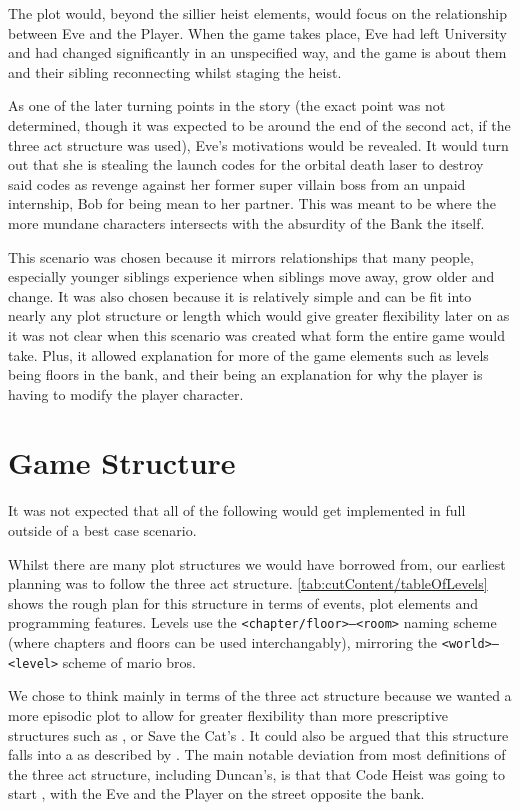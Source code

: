 The plot would, beyond the sillier heist elements, would focus on the relationship between Eve and the Player. When the game takes place, Eve had left University and had changed significantly in an unspecified way, and the game is about them and their sibling reconnecting whilst staging the heist.

As one of the later turning points in the story (the exact point was not determined, though it was expected to be around the end of the second act, if the three act structure was used), Eve's motivations would be revealed. It would turn out that she is stealing the launch codes for the orbital death laser to destroy said codes as revenge against her former super villain boss from an unpaid internship, Bob for being mean to her partner. This was meant to be where the more mundane characters intersects with the absurdity of the Bank the itself.

This scenario was chosen because it mirrors relationships that many people, especially younger siblings experience when siblings move away, grow older and change. It was also chosen because it is relatively simple and can be fit into nearly any plot structure or length which would give greater flexibility later on as it was not clear when this scenario was created what form the entire game would take. Plus, it allowed explanation for more of the game elements such as levels being floors in the bank, and their being an explanation for why the player is having to modify the player character.

\section{Game Structure}\label{sec:cut/plannedLevels}

It was not expected that all of the following would get implemented in full outside of a best case scenario.

Whilst there are many plot structures we would have borrowed from, our earliest planning was to follow the three act structure. \autoref{tab:cutContent/tableOfLevels} shows the rough plan for this structure in terms of events, plot elements and programming features. Levels use the \texttt{<chapter/floor>--<room>} naming scheme (where chapters and floors can be used interchangably), mirroring the \texttt{<world>--<level>} scheme of mario bros.

We chose to think mainly in terms of the three act structure because we wanted a more episodic plot to allow for greater flexibility than more prescriptive structures such as , or Save the Cat's  \citep{SaveTheCat}. It could also be argued that this structure falls into a  as described by \citet{plotStruct}. The main notable deviation from most definitions of the three act structure, including Duncan's, is that that Code Heist was going to start , with the Eve and the Player on the street opposite the bank.

